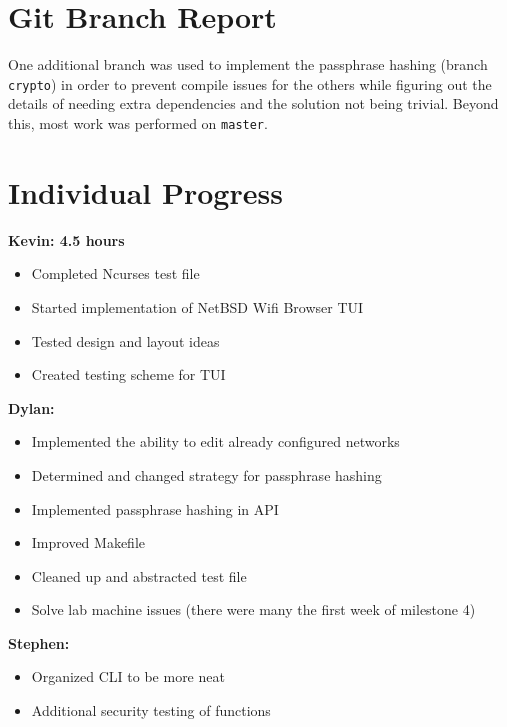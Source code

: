 \documentclass[11pt]{article}
\begin{document}
\section{Git Branch Report}
One additional branch was used to implement the passphrase hashing (branch \texttt{crypto})
in order to prevent compile issues for the others while figuring out the
details of needing extra dependencies and the solution not being trivial.
Beyond this, most work was performed on \texttt{master}.


\section{Individual Progress}

\textbf{Kevin: 4.5 hours}
\begin{itemize}
  \item Completed Ncurses test file
  \item Started implementation of NetBSD Wifi Browser TUI
  \item Tested design and layout ideas
  \item Created testing scheme for TUI
\end{itemize}

\textbf{Dylan:}
\begin{itemize}
  \item Implemented the ability to edit already configured networks
  \item Determined and changed strategy for passphrase hashing
  \item Implemented passphrase hashing in API
  \item Improved Makefile
  \item Cleaned up and abstracted test file
  \item Solve lab machine issues (there were many the first week of milestone 4)
\end{itemize}

\textbf{Stephen:}
\begin{itemize}
  \item Organized CLI to be more neat
  \item Additional security testing of functions
\end{itemize}
\end{document}
